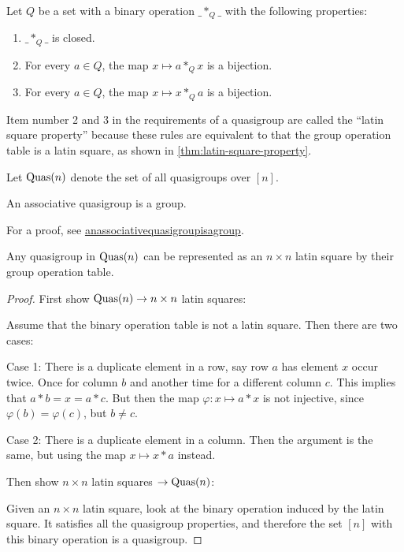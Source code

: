 \begin{definition}
    Let \( Q \) be a set with a binary operation \( \_ *_Q \_ \) with the following properties:
    \begin{enumerate}
        \item \( \_ *_Q \_ \) is closed.
        \item For every \( a \in Q \), the map \( x \mapsto a *_Q x \) is a bijection.
        \item For every \( a \in Q \), the map \( x \mapsto x *_Q a \) is a bijection.
    \end{enumerate}
\end{definition}

\begin{remark}
    Item number 2 and 3 in the requirements of a quasigroup are called the ``latin square property'' because these rules are equivalent to that the group operation table is a latin square, as shown in \autoref{thm:latin-square-property}.
\end{remark}

\begin{definition}
    Let \( \operatorname{Quas}(n) \) denote the set of all quasigroups over \( [n] \).
\end{definition}

\begin{theorem} \label{thm:associative-quasigroup-group}
    An associative quasigroup is a group.
\end{theorem}
For a proof, see \href{https://www.planetmath.org/anassociativequasigroupisagroup}{anassociativequasigroupisagroup}.

\begin{theorem} \label{thm:latin-square-property}
    Any quasigroup in \( \operatorname{Quas}(n) \) can be represented as an \( n \times n \) latin square by their group operation table.
\end{theorem}
\begin{proof}
    First show \( \operatorname{Quas}(n) \to n \times n \) latin squares:

    Assume that the binary operation table is not a latin square. Then there are two cases:

    Case 1: There is a duplicate element in a row, say row \( a \) has element \( x \) occur twice. Once for column \( b \) and another time for a different column \( c \). This implies that \( a * b = x = a * c \). But then the map \( \varphi: x \mapsto a * x \) is not injective, since \( \varphi(b) = \varphi(c) \), but \( b \neq c \).

    Case 2: There is a duplicate element in a column. Then the argument is the same, but using the map \( x \mapsto x * a \) instead.

    Then show \( n \times n \) latin squares \( \to \operatorname{Quas}(n) \):

    Given an \( n \times n \) latin square, look at the binary operation induced by the latin square. It satisfies all the quasigroup properties, and therefore the set \( [n] \) with this binary operation is a quasigroup.
\end{proof}

